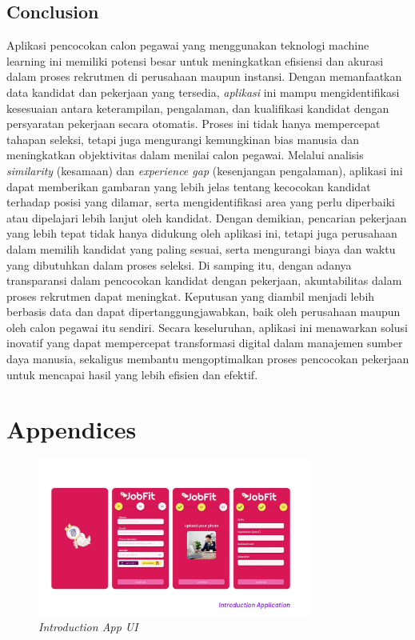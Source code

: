 \documentclass[journal,article,submit,pdftex,moreauthors]{Definitions/mdpi}
\begin{document}
\subsection{Conclusion}
Aplikasi pencocokan calon pegawai yang menggunakan teknologi machine learning ini memiliki potensi besar untuk meningkatkan efisiensi dan akurasi dalam proses rekrutmen di perusahaan maupun instansi. Dengan memanfaatkan data kandidat dan pekerjaan yang tersedia, \textit{aplikasi} ini mampu mengidentifikasi kesesuaian antara keterampilan, pengalaman, dan kualifikasi kandidat dengan persyaratan pekerjaan secara otomatis. Proses ini tidak hanya mempercepat tahapan seleksi, tetapi juga mengurangi kemungkinan bias manusia dan meningkatkan objektivitas dalam menilai calon pegawai. Melalui analisis \textit{similarity} (kesamaan) dan \textit{experience gap} (kesenjangan pengalaman), aplikasi ini dapat memberikan gambaran yang lebih jelas tentang kecocokan kandidat terhadap posisi yang dilamar, serta mengidentifikasi area yang perlu diperbaiki atau dipelajari lebih lanjut oleh kandidat. Dengan demikian, pencarian pekerjaan yang lebih tepat tidak hanya didukung oleh aplikasi ini, tetapi juga perusahaan dalam memilih kandidat yang paling sesuai, serta mengurangi biaya dan waktu yang dibutuhkan dalam proses seleksi. Di samping itu, dengan adanya transparansi dalam pencocokan kandidat dengan pekerjaan, akuntabilitas dalam proses rekrutmen dapat meningkat. Keputusan yang diambil menjadi lebih berbasis data dan dapat dipertanggungjawabkan, baik oleh perusahaan maupun oleh calon pegawai itu sendiri. Secara keseluruhan, aplikasi ini menawarkan solusi inovatif yang dapat mempercepat transformasi digital dalam manajemen sumber daya manusia, sekaligus membantu mengoptimalkan proses pencocokan pekerjaan untuk mencapai hasil yang lebih efisien dan efektif.

\section{Appendices}

\begin{figure}[H]
    \centering
    \includegraphics[width=0.8\textwidth]{image/introduction.jpeg}
    \captionsetup{justification=centering}
    \caption{\textit{Introduction App UI}}
    \label{fig:enter-label}
\end{figure}
\end{document}
